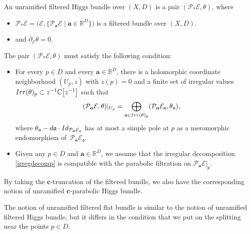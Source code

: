 \documentclass[11pt]{article}
\numberwithin{equation}{section}
\numberwithin{equation}{section}
\begin{document}
\begin{Definition}\label{filteredhiggsdef} An unramified filtered Higgs bundle over $(X,D)$ is a pair $(\mathcal{P}_*\mathcal{E},\theta)$, where
\begin{itemize}\itemsep=0pt
 \item $\mathcal{P}_*\mathcal{E}=\bigl(\mathcal{E},\bigl\{\mathcal{P}_{\boldsymbol{a}}\mathcal{E} \mid \boldsymbol{a} \in \mathbb{R}^{D}\bigr\}\bigr)$ is a filtered bundle over $(X,D)$.
 \item {} and $\overline{\partial}_{\mathcal{E}}\theta=0$.
\end{itemize}
The pair $(\mathcal{P}_*\mathcal{E},\theta)$ must satisfy the following condition:
\begin{itemize}\itemsep=0pt
 \item For every $p\in D$ and every $\boldsymbol{a}\in \mathbb{R}^{D}$, there is a holomorphic coordinate neighborhood $(U_p,z)$ with $z(p)=0$ and a finite set of irregular values $\textnormal{Irr}(\theta)_p\subset z^{-1}\mathbb{C}\bigl[z^{-1}\bigr]$ such that
 \begin{equation}\label{irregdecomp}
 (\mathcal{P}_{\boldsymbol{a}}\mathcal{E},\theta)|_{U_p}=\bigoplus_{\mathfrak{a}\in \textnormal{Irr}(\theta)_p}(\mathcal{P}_{\boldsymbol{a}}\mathcal{E}_{\mathfrak{a}},\theta_{\mathfrak{a}}),
\end{equation}
where $\theta_{\mathfrak{a}}-{\rm d}\mathfrak{a}\cdot\textnormal{Id}_{\mathcal{P}_{\boldsymbol{a}}\mathcal{E}_{\mathfrak{a}}}$ has at most a simple pole at $p$ as a meromorphic endomorphism of~$\mathcal{P}_{\boldsymbol{a}}\mathcal{E}_{\mathfrak{a}}$.
\item Given any $p\in D$ and $\boldsymbol{a}\in \mathbb{R}^D$, we assume that the irregular decomposition \eqref{irregdecomp} is compatible with the parabolic filtration on $\mathcal{P}_{\boldsymbol{a}}\mathcal{E}|_p$.
\end{itemize}

By taking the $\boldsymbol{c}$-truncation of the filtered bundle, we also have the corresponding notion of unramified $\boldsymbol{c}$-parabolic Higgs bundle.
\end{Definition}

The notion of unramified filtered flat bundle is similar to the notion of unramified filtered Higgs bundle, but it differs in the condition that we put on the splitting near the points $p\in D$.
\end{document}
